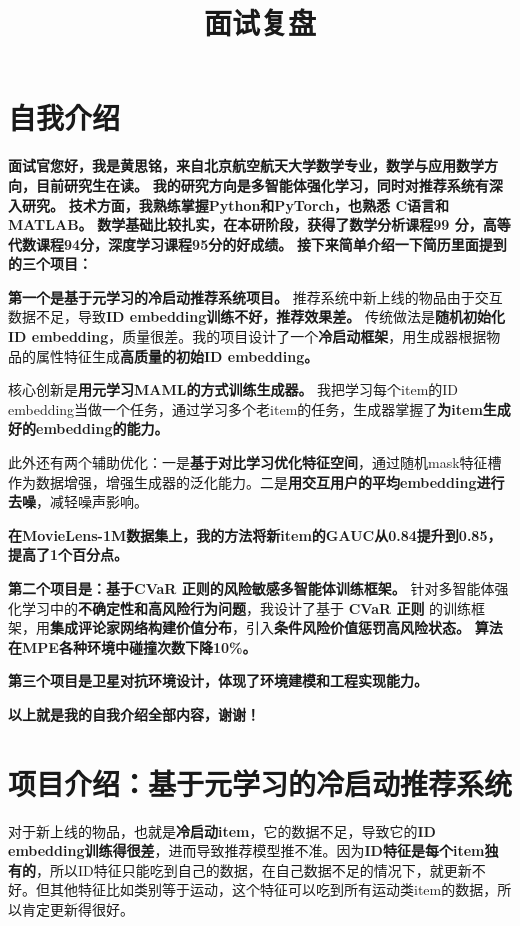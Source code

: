\documentclass[UTF8]{ctexart}
\title{面试复盘}
\author{}
\date{}
\begin{document}
\maketitle

\section{自我介绍}
{\large
\textbf{面试官您好，我是黄思铭，来自北京航空航天大学数学专业，数学与应用数学方向，目前研究生在读。} \textbf{我的研究方向是多智能体强化学习，同时对推荐系统有深入研究。} \textbf{技术方面，我熟练掌握Python和PyTorch，也熟悉 C语言和MATLAB。} \textbf{数学基础比较扎实，在本研阶段，获得了数学分析课程99 分，高等代数课程94分，深度学习课程95分的好成绩。} \textbf{接下来简单介绍一下简历里面提到的三个项目：}

\textbf{第一个是基于元学习的冷启动推荐系统项目。} 推荐系统中新上线的物品由于交互数据不足，导致\textbf{ID embedding训练不好，推荐效果差。} 传统做法是\textbf{随机初始化ID embedding}，质量很差。我的项目设计了一个\textbf{冷启动框架}，用生成器根据物品的属性特征生成\textbf{高质量的初始ID embedding。}

核心创新是\textbf{用元学习MAML的方式训练生成器。} 我把学习每个item的ID embedding当做一个任务，通过学习多个老item的任务，生成器掌握了\textbf{为item生成好的embedding的能力。}

此外还有两个辅助优化：一是\textbf{基于对比学习优化特征空间}，通过随机mask特征槽作为数据增强，增强生成器的泛化能力。二是\textbf{用交互用户的平均embedding进行去噪}，减轻噪声影响。

\textbf{在MovieLens-1M数据集上，我的方法将新item的GAUC从0.84提升到0.85，提高了1个百分点。}

\textbf{第二个项目是：基于CVaR 正则的风险敏感多智能体训练框架。} 针对多智能体强化学习中的\textbf{不确定性和高风险行为问题}，我设计了基于 \textbf{CVaR 正则} 的训练框架，用\textbf{集成评论家网络构建价值分布}，引入\textbf{条件风险价值惩罚高风险状态。} \textbf{算法在MPE各种环境中碰撞次数下降10\%。}

\textbf{第三个项目是卫星对抗环境设计，体现了环境建模和工程实现能力。}

\textbf{以上就是我的自我介绍全部内容，谢谢！}
}

\newpage


\section{项目介绍：基于元学习的冷启动推荐系统}

对于新上线的物品，也就是\textbf{冷启动item}，它的数据不足，导致它的\textbf{ID embedding训练得很差}，进而导致推荐模型推不准。因为\textbf{ID特征是每个item独有的}，所以ID特征只能吃到自己的数据，在自己数据不足的情况下，就更新不好。但其他特征比如类别等于运动，这个特征可以吃到所有运动类item的数据，所以肯定更新得很好。
\end{document}
